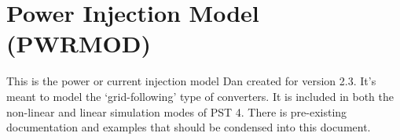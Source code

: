 \section{Power Injection Model (PWRMOD)}  
This is the power or current injection model Dan created for version 2.3.
It's meant to model the `grid-following' type of converters.
It is included in both the non-linear and linear simulation modes of PST 4.
There is pre-existing documentation and examples that should be condensed into this document.